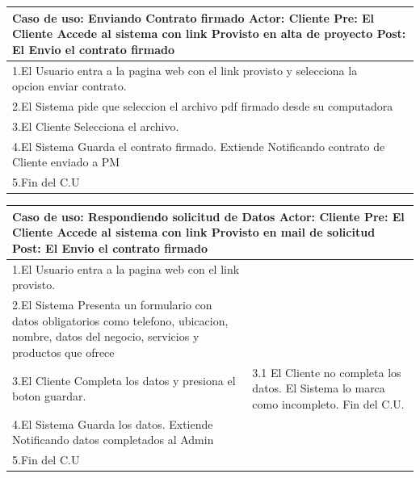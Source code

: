 \begin{longtable}{|p{}|p{}|}
    \hline
    \multicolumn{2}{|p{16cm}|}{
        \textbf{Caso de uso:} Enviando Contrato firmado \newline
        \textbf{Actor:} Cliente\newline
        \textbf{Pre: }El Cliente Accede al sistema con link Provisto en alta de proyecto\newline
        \textbf{Post: }El Envio el contrato firmado
    }\\
    \hline
    1.El Usuario entra a la pagina web con el link provisto y selecciona la opcion enviar contrato.&\\
    \hline
    2.El Sistema pide que seleccion el archivo pdf firmado desde su computadora&    \\
    \hline
    3.El Cliente Selecciona el archivo.& \\
    \hline
    4.El Sistema Guarda el contrato firmado. Extiende Notificando contrato de Cliente enviado a PM&\\
    \hline
    5.Fin del C.U&\\
    \hline
\end{longtable}

\begin{longtable}{|p{}|p{}|}
    \hline
    \multicolumn{2}{|p{16cm}|}{
        \textbf{Caso de uso:} Respondiendo solicitud de Datos \newline
        \textbf{Actor:} Cliente\newline
        \textbf{Pre: }El Cliente Accede al sistema con link Provisto en mail de solicitud\newline
        \textbf{Post: }El Envio el contrato firmado
    }\\
    \hline
    1.El Usuario entra a la pagina web con el link provisto.&\\
    \hline
    2.El Sistema Presenta un formulario con datos obligatorios como telefono, ubicacion, nombre, datos del negocio, servicios y productos que ofrece &    \\
    \hline
    3.El Cliente Completa los datos y presiona el boton guardar. &3.1 El Cliente no completa los datos.\newline 3.2 El Sistema lo marca como incompleto.\newline 3.3 Fin del C.U.\\
    \hline
    4.El Sistema Guarda los datos. Extiende Notificando datos completados al Admin&\\
    \hline
    5.Fin del C.U&\\
    \hline
\end{longtable}


